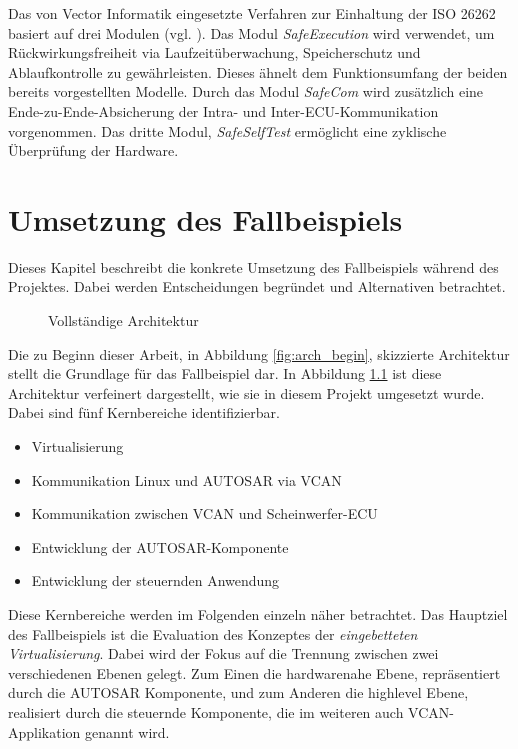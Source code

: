 \documentclass[
  a4paper,					    %
  twoside,
  DIV=calc,     				%
  bibliography=totoc,
  cleardoublepage=empty,
  ngerman,     					%
  final       					%
]{scrbook}
\begin{document}
Das von Vector Informatik eingesetzte Verfahren zur Einhaltung der ISO 26262 basiert auf drei Modulen (vgl. \cite{microsar}). Das Modul \emph{SafeExecution} wird verwendet, um Rückwirkungsfreiheit via Laufzeitüberwachung, Speicherschutz und Ablaufkontrolle zu gewährleisten. Dieses ähnelt dem Funktionsumfang der beiden bereits vorgestellten Modelle. Durch das Modul \emph{SafeCom} wird zusätzlich eine Ende-zu-Ende-Absicherung der Intra- und Inter-ECU-Kommunikation vorgenommen. Das dritte Modul, \emph{SafeSelfTest} ermöglicht eine zyklische Überprüfung der Hardware.









\chapter{Umsetzung des Fallbeispiels}
\label{sec:Umsetzung_Fallbeispiel}
Dieses Kapitel beschreibt die konkrete Umsetzung des Fallbeispiels während des Projektes. Dabei werden Entscheidungen begründet und Alternativen betrachtet.

\begin{figure}[ht]
    \centering
    
    \caption{Vollständige Architektur}
    \label{fig:arch_finished}
\end{figure}

Die zu Beginn dieser Arbeit, in Abbildung \ref{fig:arch_begin}, skizzierte Architektur stellt die Grundlage für das Fallbeispiel dar. In Abbildung \ref{fig:arch_finished} ist diese Architektur verfeinert dargestellt, wie sie in diesem Projekt umgesetzt wurde. Dabei sind fünf Kernbereiche identifizierbar.

\begin{itemize}
    \item Virtualisierung
    \item Kommunikation Linux und AUTOSAR via VCAN
    \item Kommunikation zwischen VCAN und Scheinwerfer-ECU
    \item Entwicklung der AUTOSAR-Komponente
    \item Entwicklung der steuernden Anwendung
\end{itemize}

Diese Kernbereiche werden im Folgenden einzeln näher betrachtet. Das Hauptziel des Fallbeispiels ist die Evaluation des Konzeptes der \emph{eingebetteten Virtualisierung}. Dabei wird der Fokus auf die Trennung zwischen zwei verschiedenen Ebenen gelegt. Zum Einen die hardwarenahe Ebene, repräsentiert durch die AUTOSAR Komponente, und zum Anderen die highlevel Ebene, realisiert durch die steuernde Komponente, die im weiteren auch VCAN-Applikation genannt wird.
\end{document}
